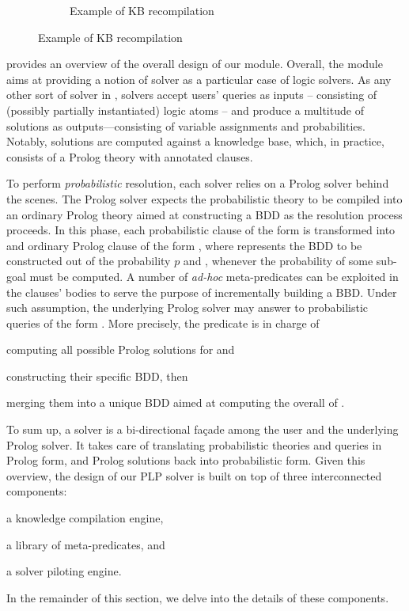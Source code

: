 \documentclass[12pt,a4paper,openright,twoside]{book}
\begin{document}
\begin{figure}[t]
\begin{subfigure}{0.49\linewidth}
        \caption{Example of KB recompilation}
        \label{fig:kb-recompilation}
    \end{subfigure}
\end{figure}

 provides an overview of the overall design of our  module.
%
Overall, the module aims at providing a notion of \problog{} solver as a particular case of logic solvers.
%
As any other sort of solver in \twopkt{}, \problog{} solvers accept users' queries as inputs -- consisting of (possibly partially instantiated) logic atoms -- and produce a multitude of solutions as outputs---consisting of variable assignments and probabilities.
%
Notably, solutions are computed against a \problog{} knowledge base, which, in practice, consists of a Prolog theory with annotated clauses.

To perform \emph{probabilistic} resolution, each \problog{} solver relies on a Prolog solver behind the scenes.
%
The Prolog solver expects the probabilistic theory to be compiled into an ordinary Prolog theory aimed at constructing a BDD as the resolution process proceeds.
%
In this phase, each probabilistic clause of the form  is transformed into and ordinary Prolog clause of the form , where  represents the BDD to be constructed out of the probability $p$ and , whenever the probability of some sub-goal  must be computed.
%
A number of \emph{ad-hoc} meta-predicates can be exploited in the clauses' bodies to serve the purpose of incrementally building a BBD.
%
Under such assumption, the underlying Prolog solver may answer to probabilistic queries of the form .
%
More precisely, the  predicate is in charge of
%
\begin{inlinelist}
    \item computing all possible Prolog solutions for  and
    \item constructing their specific BDD, then
    \item merging them into a unique BDD aimed at computing the overall  of .
\end{inlinelist}

To sum up, a \problog{} solver is a bi-directional façade among the user and the underlying Prolog solver.
%
It takes care of translating probabilistic theories and queries in Prolog form, and Prolog solutions back into probabilistic form.
%
Given this overview, the design of our PLP solver is built on top of three interconnected components:
%
\begin{inlinelist}
    \item a knowledge compilation engine,
    \item a library of meta-predicates, and
    \item a solver piloting engine.
\end{inlinelist}
%
In the remainder of this section, we delve into the details of these components.
\end{document}
